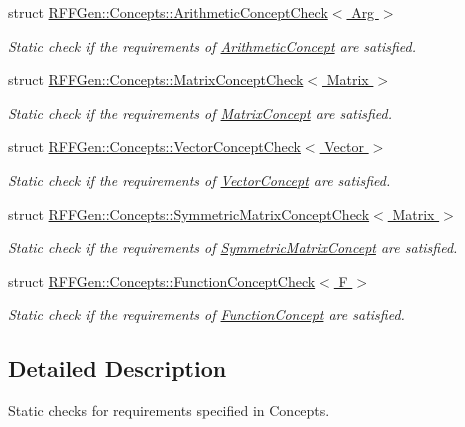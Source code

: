 \begin{DoxyCompactItemize}
struct \hyperlink{structRFFGen_1_1Concepts_1_1ArithmeticConceptCheck}{R\-F\-F\-Gen\-::\-Concepts\-::\-Arithmetic\-Concept\-Check$<$ Arg $>$}
\begin{DoxyCompactList}\small\item\em Static check if the requirements of \hyperlink{structRFFGen_1_1Concepts_1_1ArithmeticConcept}{Arithmetic\-Concept} are satisfied. \end{DoxyCompactList}\item 
struct \hyperlink{structRFFGen_1_1Concepts_1_1MatrixConceptCheck}{R\-F\-F\-Gen\-::\-Concepts\-::\-Matrix\-Concept\-Check$<$ Matrix $>$}
\begin{DoxyCompactList}\small\item\em Static check if the requirements of \hyperlink{structRFFGen_1_1Concepts_1_1MatrixConcept}{Matrix\-Concept} are satisfied. \end{DoxyCompactList}\item 
struct \hyperlink{structRFFGen_1_1Concepts_1_1VectorConceptCheck}{R\-F\-F\-Gen\-::\-Concepts\-::\-Vector\-Concept\-Check$<$ Vector $>$}
\begin{DoxyCompactList}\small\item\em Static check if the requirements of \hyperlink{structRFFGen_1_1Concepts_1_1VectorConcept}{Vector\-Concept} are satisfied. \end{DoxyCompactList}\item 
struct \hyperlink{structRFFGen_1_1Concepts_1_1SymmetricMatrixConceptCheck}{R\-F\-F\-Gen\-::\-Concepts\-::\-Symmetric\-Matrix\-Concept\-Check$<$ Matrix $>$}
\begin{DoxyCompactList}\small\item\em Static check if the requirements of \hyperlink{structRFFGen_1_1Concepts_1_1SymmetricMatrixConcept}{Symmetric\-Matrix\-Concept} are satisfied. \end{DoxyCompactList}\item 
struct \hyperlink{structRFFGen_1_1Concepts_1_1FunctionConceptCheck}{R\-F\-F\-Gen\-::\-Concepts\-::\-Function\-Concept\-Check$<$ F $>$}
\begin{DoxyCompactList}\small\item\em Static check if the requirements of \hyperlink{structRFFGen_1_1Concepts_1_1FunctionConcept}{Function\-Concept} are satisfied. \end{DoxyCompactList}\end{DoxyCompactItemize}


\subsection{Detailed Description}
Static checks for requirements specified in Concepts. 